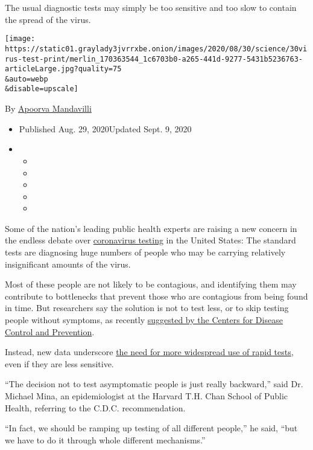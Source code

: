 The usual diagnostic tests may simply be too sensitive and too slow to
contain the spread of the virus.

\texttt{[image: https://static01.graylady3jvrrxbe.onion/images/2020/08/30/science/30virus-test-print/merlin\_170363544\_1c6703b0-a265-441d-9277-5431b5236763-articleLarge.jpg?quality=75\\\&auto=webp\\\&disable=upscale]}

By
\href{https://www.nytimes3xbfgragh.onion/by/apoorva-mandavilli}{Apoorva
Mandavilli}

\begin{itemize}
\item
  Published Aug. 29, 2020Updated Sept. 9, 2020
\item
  \begin{itemize}
  \item
  \item
  \item
  \item
  \item
  \end{itemize}
\end{itemize}

Some of the nation's leading public health experts are raising a new
concern in the endless debate over
\href{https://www.nytimes3xbfgragh.onion/2020/09/09/upshot/coronavirus-surprise-test-fees.html}{coronavirus
testing} in the United States: The standard tests are diagnosing huge
numbers of people who may be carrying relatively insignificant amounts
of the virus.

Most of these people are not likely to be contagious, and identifying
them may contribute to bottlenecks that prevent those who are contagious
from being found in time. But researchers say the solution is not to
test less, or to skip testing people without symptoms, as recently
\href{https://www.nytimes3xbfgragh.onion/2020/08/27/us/politics/trump-coronavirus-testing.html}{suggested
by the Centers for Disease Control and Prevention}.

Instead, new data underscore
\href{https://www.nytimes3xbfgragh.onion/2020/08/06/health/rapid-Covid-tests.html}{the
need for more widespread use of rapid tests}, even if they are less
sensitive.

``The decision not to test asymptomatic people is just really
backward,'' said Dr. Michael Mina, an epidemiologist at the Harvard T.H.
Chan School of Public Health, referring to the C.D.C. recommendation.

``In fact, we should be ramping up testing of all different people,'' he
said, ``but we have to do it through whole different mechanisms.''

